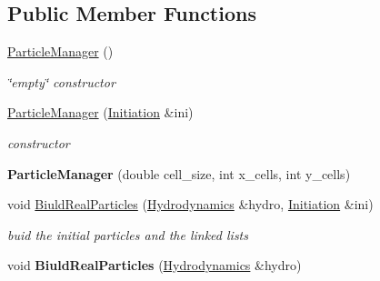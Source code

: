 \subsection*{Public Member Functions}
\begin{CompactItemize}
\item 
\hypertarget{classParticleManager_36f2371b06ef7bd96fc1e0cb1fcebd66}{
\hyperlink{classParticleManager_36f2371b06ef7bd96fc1e0cb1fcebd66}{ParticleManager} ()}
\label{classParticleManager_36f2371b06ef7bd96fc1e0cb1fcebd66}

\begin{CompactList}\small\item\em \char`\"{}empty\char`\"{} constructor \item\end{CompactList}\item 
\hyperlink{classParticleManager_11a8f14c20f087713172d230de468166}{ParticleManager} (\hyperlink{classInitiation}{Initiation} \&ini)
\begin{CompactList}\small\item\em constructor \item\end{CompactList}\item 
\hypertarget{classParticleManager_7e835509b041635805a127cbedc194bd}{
\textbf{ParticleManager} (double cell\_\-size, int x\_\-cells, int y\_\-cells)}
\label{classParticleManager_7e835509b041635805a127cbedc194bd}

\item 
void \hyperlink{classParticleManager_6ee12c3925f371782800a50b17ac0941}{BiuldRealParticles} (\hyperlink{classHydrodynamics}{Hydrodynamics} \&hydro, \hyperlink{classInitiation}{Initiation} \&ini)
\begin{CompactList}\small\item\em buid the initial particles and the linked lists \item\end{CompactList}\item 
\hypertarget{classParticleManager_04ed35d52cf918b98006a0def713dc89}{
void \textbf{BiuldRealParticles} (\hyperlink{classHydrodynamics}{Hydrodynamics} \&hydro)}
\label{classParticleManager_04ed35d52cf918b98006a0def713dc89}


\end{CompactItemize}
